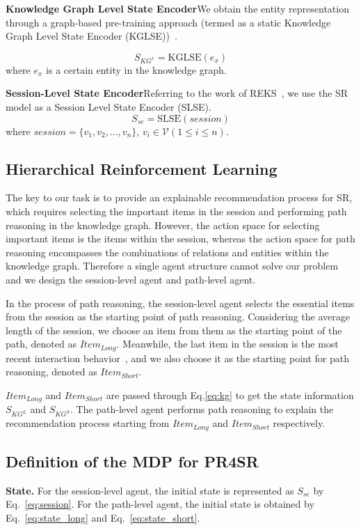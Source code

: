 \documentclass[10pt,journal,compsoc]{IEEEtran}
\begin{document}
\noindent \textbf{Knowledge Graph Level State Encoder}\quad We obtain the entity representation through a graph-based pre-training approach (termed as a static Knowledge Graph Level State Encoder (KGLSE))~\cite{ml_transe}.

\begin{equation}
    S_{KG^{x}}=\mathrm{KGLSE}(e_{x})
    \label{eq:kg}
\end{equation}
\noindent where $e_x$ is a certain entity in the knowledge graph.

\noindent \textbf{Session-Level State Encoder}\quad Referring to the work of REKS~\cite{rs_reks}, we use the SR model as a Session Level State Encoder (SLSE).
\begin{equation}
    S_{se}=\mathrm{SLSE}(session)
    \label{eq:session}
\end{equation}
where $session=\{v_1,v_2,... ,v_n\}$, $v_i\in \mathcal{V} (1\leq i\leq n)$.
\subsection{Hierarchical Reinforcement Learning}
The key to our task is to provide an explainable recommendation process for SR, which requires selecting the important items in the session and performing path reasoning in the knowledge graph. However, the action space for selecting important items is the items within the session, whereas the action space for path reasoning encompasses the combinations of relations and entities within the knowledge graph. Therefore a single agent structure cannot solve our problem and we design the session-level agent and path-level agent.

In the process of path reasoning, the session-level agent selects the essential items from the session as the starting point of path reasoning. Considering the average length of the session, we choose an item from them as the starting point of the path, denoted as $Item_{Long}$. Meanwhile, the last item in the session is the most recent interaction behavior~\cite{rs_stamp,rs_reks}, and we also choose it as the starting point for path reasoning, denoted as $Item_{Short}$.

$Item_{Long}$ and $Item_{Short}$ are passed through Eq.\ref{eq:kg} to get the state information $S_{KG^{L}}$ and $S_{KG^{S}}$. The path-level agent performs path reasoning to explain the recommendation process starting from $Item_{Long}$ and $Item_{Short}$ respectively.
\subsection{Definition of the MDP for PR4SR}
\textbf{State.} For the session-level agent, the initial state is represented as $S_{se}$ by Eq.~\ref{eq:session}. For the path-level agent, the initial state is obtained by Eq.~\ref{eq:state_long} and Eq.~\ref{eq:state_short}.
\end{document}

